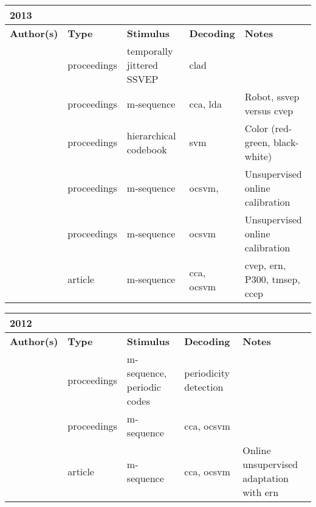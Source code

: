 \documentclass[a4paper,landscape]{article}
\begin{document}
\begin{table}[H]
	\begin{tabular}{p{5cm}p{2cm}p{5cm}p{5cm}p{6.5cm}}
		\textbf{2013} & & & & \\
		\toprule
		\textbf{Author(s)} & \textbf{Type} & \textbf{Stimulus} & \textbf{Decoding} & \textbf{Notes} \\
		\midrule
		\citeauthor{bohorquez2013} & proceedings & temporally jittered SSVEP & \acrshort{clad} & \\
		\citeauthor{kapeller2013} & proceedings & m-sequence & \acrshort{cca}, \acrshort{lda} & Robot, \acrshort{ssvep} versus \acrshort{cvep} \\
		\citeauthor{riechmann2013} & proceedings & hierarchical codebook & \acrshort{svm} & Color (red-green, black-white) \\
		\citeauthor{spuler2013a} & proceedings & m-sequence & \acrshort{ocsvm}, & Unsupervised online calibration \\
		\citeauthor{spuler2013b} & proceedings & m-sequence & \acrshort{ocsvm} &  Unsupervised online calibration \\
		\citeauthor{spuler2013c} & article & m-sequence & \acrshort{cca}, \acrshort{ocsvm} & \acrshort{cvep}, \acrshort{ern}, P300, \acrshort{tmsep}, \acrshort{ccep} \\
		\bottomrule
	\end{tabular}
\end{table}

\begin{table}[H]
	\begin{tabular}{p{5cm}p{2cm}p{5cm}p{5cm}p{6.5cm}}
		\textbf{2012} & & & & \\
		\toprule
		\textbf{Author(s)} & \textbf{Type} & \textbf{Stimulus} & \textbf{Decoding} & \textbf{Notes} \\
		\midrule
		\citeauthor{nakanishi2012} & proceedings & m-sequence, periodic codes & periodicity detection & \\
		\citeauthor{spuler2012a} & proceedings & m-sequence & \acrshort{cca}, \acrshort{ocsvm} & \\
		\citeauthor{spuler2012b} & article & m-sequence & \acrshort{cca}, \acrshort{ocsvm} & Online unsupervised adaptation with \acrshort{ern} \\
		\bottomrule
	\end{tabular}
\end{table}
\end{document}

